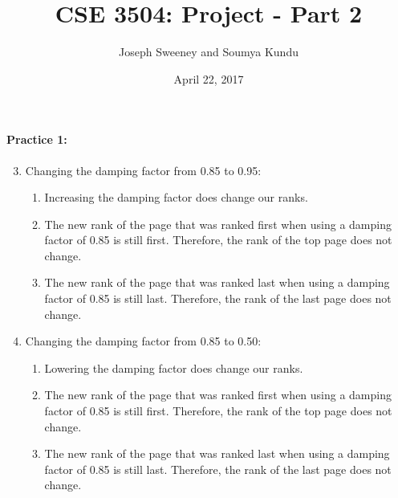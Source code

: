 \documentclass[12pt]{article}
\title{CSE 3504: Project - Part 2}
\author{Joseph Sweeney and Soumya Kundu}
\date{April 22, 2017}
\begin{document}
\maketitle
\vspace{-0.5in}

\doublespacing

\paragraph{Practice 1:}
	\begin{enumerate}
    \setcounter{enumi}{2}
	\item Changing the damping factor from 0.85 to 0.95:
		\begin{enumerate}
		\item Increasing the damping factor does change our ranks.
        \item The new rank of the page that was ranked first when using a damping factor of 0.85 is still first. Therefore, the rank of the top page does not change.
        \item The new rank of the page that was ranked last when using a damping factor of 0.85 is still last. Therefore, the rank of the last page does not change.
        \end{enumerate}
	\item Changing the damping factor from 0.85 to 0.50:
		\begin{enumerate}
		\item Lowering the damping factor does change our ranks.
        \item The new rank of the page that was ranked first when using a damping factor of 0.85 is still first. Therefore, the rank of the top page does not change.
        \item The new rank of the page that was ranked last when using a damping factor of 0.85 is still last. Therefore, the rank of the last page does not change.
        \end{enumerate}
	\end{enumerate}

\pagebreak
\end{document}
